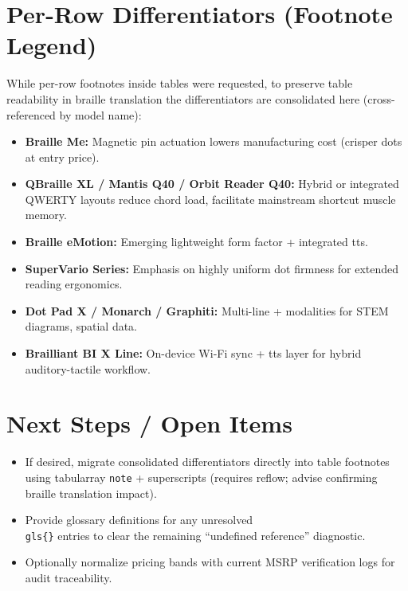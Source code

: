 \section*{Per-Row Differentiators (Footnote Legend)}
While per-row footnotes inside tables were requested, to preserve table readability in braille translation the differentiators are consolidated here (cross-referenced by model name):
\begin{itemize}
	\item \textbf{Braille Me:} Magnetic pin actuation lowers manufacturing cost (crisper dots at entry price).
	\item \textbf{QBraille XL / Mantis Q40 / Orbit Reader Q40:} Hybrid or integrated QWERTY layouts reduce chord load, facilitate mainstream shortcut muscle memory.
	\item \textbf{Braille eMotion:} Emerging lightweight form factor + integrated \gls{tts}.
	\item \textbf{SuperVario Series:} Emphasis on highly uniform dot firmness for extended reading ergonomics.
	\item \textbf{Dot Pad X / Monarch / Graphiti:} Multi-line +  modalities for STEM diagrams, spatial data.
	\item \textbf{Brailliant BI X Line:} On-device Wi‑Fi sync + \gls{tts} layer for hybrid auditory-tactile workflow.
\end{itemize}

\section*{Next Steps / Open Items}
\begin{itemize}
	\item If desired, migrate consolidated differentiators directly into table footnotes using tabularray \texttt{note} + superscripts (requires reflow; advise confirming braille translation impact).
	\item Provide glossary definitions for any unresolved \texttt{\\gls\{\}} entries to clear the remaining “undefined reference” diagnostic.
	\item Optionally normalize pricing bands with current MSRP verification logs for audit traceability.
\end{itemize}


